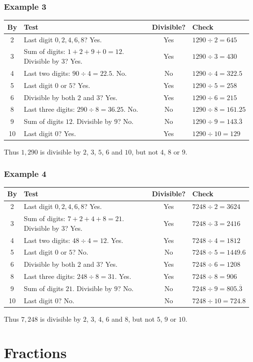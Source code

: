 \documentclass[letter]{article}
\newcommand{\chp}{}
\newcommand{\solsec}[1]{\phantomsection\label{sec:\chp ex#1}\subsubsection*{Example #1}}
\begin{document}
\solsec{3}
\begin{center}
\begin{tabular}{c|p{2.1in}|c|l}
By & Test & Divisible? & Check\\\hline
2 & Last digit $0,2,4,6,8$? Yes. & Yes & $1290\div2=645$\\
3 & Sum of digits: $1+2+9+0=12$. Divisible by $3$? Yes. & Yes & $1290\div3=430$\\
4 & Last two digits: $90\div4=22.5$. No. & No & $1290\div4=322.5$\\
5 & Last digit $0$ or $5$? Yes. & Yes & $1290\div5=258$\\
6 & Divisible by both $2$ and $3$? Yes. & Yes & $1290\div6=215$\\
8 & Last three digits: $290\div8=36.25$. No. & No & $1290\div8=161.25$\\
9 & Sum of digits $12$. Divisible by $9$? No. & No & $1290\div9=143.\overline3$\\
10 & Last digit $0$? Yes. & Yes & $1290\div10=129$
\end{tabular}
\end{center}
Thus $1{,}290$ is divisible by $2$, $3$, $5$, $6$ and $10$, but not $4$, $8$ or $9$.

\solsec{4}
\begin{center}
\begin{tabular}{c|p{2.1in}|c|l}
By & Test & Divisible? & Check\\\hline
2 & Last digit $0,2,4,6,8$? Yes. & Yes & $7248\div2=3624$\\
3 & Sum of digits: $7+2+4+8=21$. Divisible by $3$? Yes. & Yes & $7248\div3=2416$\\
4 & Last two digits: $48\div4=12$. Yes. & Yes & $7248\div4=1812$\\
5 & Last digit $0$ or $5$? No. & No & $7248\div5=1449.6$\\
6 & Divisible by both $2$ and $3$? Yes. & Yes & $7248\div6=1208$\\
8 & Last three digits: $248\div8=31$. Yes. & Yes & $7248\div8=906$\\
9 & Sum of digits $21$. Divisible by $9$? No. & No & $7248\div9=805.\overline3$\\
10 & Last digit $0$? No. & No & $7248\div10=724.8$
\end{tabular}
\end{center}
Thus $7{,}248$ is divisible by $2$, $3$, $4$, $6$ and $8$, but not $5$, $9$ or $10$.
\clearpage
\def\chp{frac}
\lfoot{}
\section{Fractions}
\end{document}
